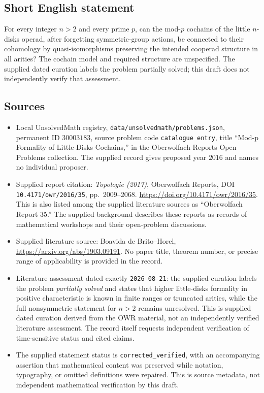 \documentclass[11pt]{article}
\begin{document}
\subsection{Short English statement}
For every integer \(n>2\) and every prime \(p\), can the mod-\(p\) cochains of the little \(n\)-disks operad, after forgetting symmetric-group actions, be connected to their cohomology by quasi-isomorphisms preserving the intended cooperad structure in all arities? The cochain model and required structure are unspecified. The supplied dated curation labels the problem partially solved; this draft does not independently verify that assessment.
\subsection{Sources}
\begin{itemize}
\item Local UnsolvedMath registry, \texttt{data/unsolvedmath/problems.json}, permanent ID \(30003183\), source problem code \texttt{catalogue entry}, title ``Mod-p Formality of Little-Disks Cochains,'' in the Oberwolfach Reports Open Problems collection. The supplied record gives proposed year \(2016\) and names no individual proposer.
\item Supplied report citation: \emph{Topologie (2017)}, Oberwolfach Reports, DOI \texttt{10.4171/owr/2016/35}, pp.\ 2009--2068. \url{https://doi.org/10.4171/owr/2016/35}. This is also listed among the supplied literature sources as ``Oberwolfach Report 35.'' The supplied background describes these reports as records of mathematical workshops and their open-problem discussions.
\item Supplied literature source: Boavida de Brito--Horel, \url{https://arxiv.org/abs/1903.09191}. No paper title, theorem number, or precise range of applicability is provided in the record.
\item Literature assessment dated exactly \texttt{2026-08-21}: the supplied curation labels the problem \emph{partially solved} and states that higher little-disks formality in positive characteristic is known in finite ranges or truncated arities, while the full nonsymmetric statement for \(n>2\) remains unresolved. This is supplied dated curation derived from the OWR material, not an independently verified literature assessment. The record itself requests independent verification of time-sensitive status and cited claims.
\item The supplied statement status is \texttt{corrected\_verified}, with an accompanying assertion that mathematical content was preserved while notation, typography, or omitted definitions were repaired. This is source metadata, not independent mathematical verification by this draft.
\end{itemize}
\end{document}
